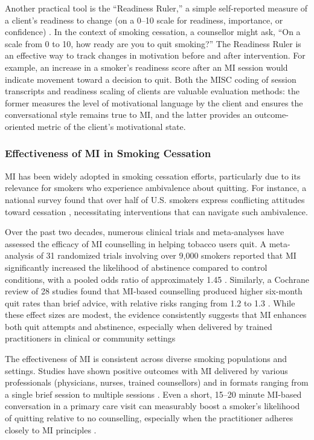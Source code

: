 Another practical tool is the ``Readiness Ruler,'' a simple self-reported measure of a client’s readiness to change (on a 0–10 scale for readiness, importance, or confidence) \cite{Boudreaux2012}. In the context of smoking cessation, a counsellor might ask, ``On a scale from 0 to 10, how ready are you to quit smoking?'' The Readiness Ruler is an effective way to track changes in motivation before and after intervention. For example, an increase in a smoker's readiness score after an MI session would indicate movement toward a decision to quit. Both the MISC coding of session transcripts and readiness scaling of clients are valuable evaluation methods: the former measures the level of motivational language by the client and ensures the conversational style remains true to MI, and the latter provides an outcome-oriented metric of the client’s motivational state.

\subsubsection{Effectiveness of MI in Smoking Cessation}
MI has been widely adopted in smoking cessation efforts, particularly due to its relevance for smokers who experience ambivalence about quitting. For instance, a national survey found that over half of U.S. smokers express conflicting attitudes toward cessation \cite{Babb2017}, necessitating interventions that can navigate such ambivalence.

Over the past two decades, numerous clinical trials and meta-analyses have assessed the efficacy of MI counselling in helping tobacco users quit. A meta-analysis of 31 randomized trials involving over 9,000 smokers reported that MI significantly increased the likelihood of abstinence compared to control conditions, with a pooled odds ratio of approximately 1.45 \cite{Heckman2010}. Similarly, a Cochrane review of 28 studies found that MI-based counselling produced higher six-month quit rates than brief advice, with relative risks ranging from 1.2 to 1.3 \cite{Lindson2015}. While these effect sizes are modest, the evidence consistently suggests that MI enhances both quit attempts and abstinence, especially when delivered by trained practitioners in clinical or community settings

The effectiveness of MI is consistent across diverse smoking populations and settings. Studies have shown positive outcomes with MI delivered by various professionals (physicians, nurses, trained counsellors) and in formats ranging from a single brief session to multiple sessions \cite{Lindson2015}. Even a short, 15–20 minute MI-based conversation in a primary care visit can measurably boost a smoker's likelihood of quitting relative to no counselling, especially when the practitioner adheres closely to MI principles \cite{zanjani2008effectiveness}. 


